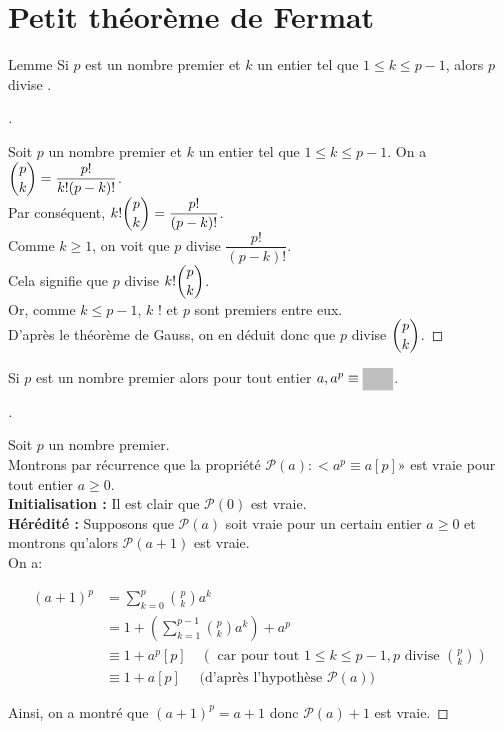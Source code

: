\documentclass[12pt]{article}
\newcommand{\hideM}[1]{\mbox{\vphantom{$#1$}\smash{\colorbox{gray!50}{\phantom{$\displaystyle #1$}}}} }
\newcommand{\hide}[1]{\mbox{\vphantom{#1}\smash{\colorbox{gray!50}{\phantom{#1}}}}}
\theoremstyle{break}
\newenvironment{demo}[1][\proofname]{%
  \begin{proof}[#1]$ $\newline
}{%
  \end{proof}
}
\begin{document}
\section{Petit théorème de Fermat}
\begin{proposition}{Lemme}{}
  Si $p$ est un nombre premier et $k$ un entier tel que $1 \leqslant k \leqslant p-1$, alors $p$ divise \hide{$\dbinom{p}{k}$}.
\end{proposition}
\begin{demo}
Soit $p$ un nombre premier et $k$ un entier tel que $1 \leqslant k \leqslant p-1$. On a $\dbinom{p}{k}=\dfrac{p!}{k!(p-k)!}$.\\
Par conséquent, $k!\dbinom{p}{k}=\dfrac{p!}{(p-k)!}$.\\
Comme $k \geqslant 1$, on voit que $p$ divise $\dfrac{p!}{(p-k)!}$.\\
Cela signifie que $p$ divise $k!\dbinom{p}{k}$.\\
Or, comme $k \leqslant p-1$, $k$ ! et $p$ sont premiers entre eux.\\
D'après le théorème de Gauss, on en déduit donc que $p$ divise $\dbinom{p}{k}$.
\end{demo}

\begin{proposition}{}{}
Si $p$ est un nombre premier alors pour tout entier $a, a^{p} \equiv \hideM{a[p]}$.
\end{proposition}

\begin{demo}
Soit $p$ un nombre premier.\\
Montrons par récurrence que la propriété $\mathcal{P}(a):<a^{p} \equiv a[p] »$ est vraie pour tout entier $a \geqslant 0$.\\
\textbf{Initialisation :} Il est clair que $\mathcal{P}(0)$ est vraie.\\
\textbf{Hérédité :} Supposons que $\mathcal{P}(a)$ soit vraie pour un certain entier $a \geqslant 0$ et montrons qu'alors $\mathcal{P}(a+1)$ est vraie.\\
On a:

$$
\begin{aligned}
(a+1)^{p} & =\sum_{k=0}^{p}\binom{p}{k} a^{k} \\
& =1+\left(\sum_{k=1}^{p-1}\binom{p}{k} a^{k}\right)+a^{p} \\
& \equiv 1+a^{p}[p] \quad\left(\text { car pour tout } 1 \leqslant k \leqslant p-1, p \text { divise }\binom{p}{k}\right) \\
& \equiv 1+a[p] \quad \text { (d'après l'hypothèse } \mathcal{P}(a))
\end{aligned}
$$

Ainsi, on a montré que $(a+1)^{p}=a+1$ donc $\mathcal{P}(a)+1$ est vraie.
\end{demo}
\end{document}
